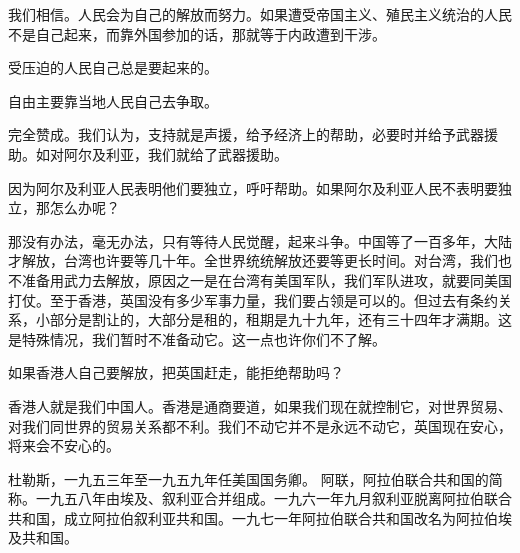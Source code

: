 我们相信。人民会为自己的解放而努力。如果遭受帝国主义、殖民主义统治的人民不是自己起来，而靠外国参加的话，那就等于内政遭到干涉。

受压迫的人民自己总是要起来的。

自由主要靠当地人民自己去争取。

完全赞成。我们认为，支持就是声援，给予经济上的帮助，必要时并给予武器援助。如对阿尔及利亚，我们就给了武器援助。

因为阿尔及利亚人民表明他们要独立，呼吁帮助。如果阿尔及利亚人民不表明要独立，那怎么办呢？

那没有办法，毫无办法，只有等待人民觉醒，起来斗争。中国等了一百多年，大陆才解放，台湾也许要等几十年。全世界统统解放还要等更长时间。对台湾，我们也不准备用武力去解放，原因之一是在台湾有美国军队，我们军队进攻，就要同美国打仗。至于香港，英国没有多少军事力量，我们要占领是可以的。但过去有条约关系，小部分是割让的，大部分是租的，租期是九十九年，还有三十四年才满期。这是特殊情况，我们暂时不准备动它。这一点也许你们不了解。

如果香港人自己要解放，把英国赶走，能拒绝帮助吗？

香港人就是我们中国人。香港是通商要道，如果我们现在就控制它，对世界贸易、对我们同世界的贸易关系都不利。我们不动它并不是永远不动它，英国现在安心，将来会不安心的。

\begin{maonote}
杜勒斯，一九五三年至一九五九年任美国国务卿。
阿联，阿拉伯联合共和国的简称。一九五八年由埃及、叙利亚合并组成。一九六一年九月叙利亚脱离阿拉伯联合共和国，成立阿拉伯叙利亚共和国。一九七一年阿拉伯联合共和国改名为阿拉伯埃及共和国。
\end{maonote}
